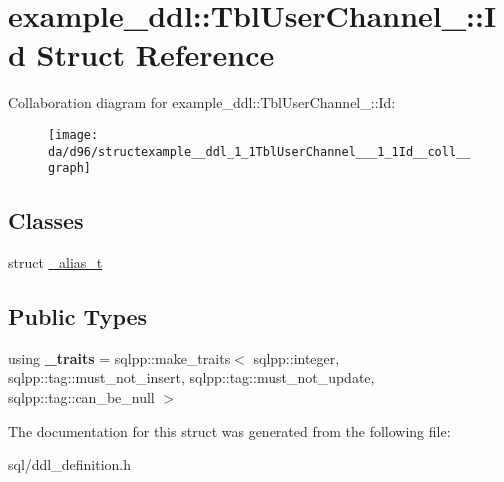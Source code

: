 \hypertarget{structexample__ddl_1_1TblUserChannel___1_1Id}{}\section{example\+\_\+ddl\+:\+:Tbl\+User\+Channel\+\_\+\+:\+:Id Struct Reference}
\label{structexample__ddl_1_1TblUserChannel___1_1Id}


Collaboration diagram for example\+\_\+ddl\+:\+:Tbl\+User\+Channel\+\_\+\+:\+:Id\+:
\nopagebreak
\begin{figure}[H]
\begin{center}
\leavevmode
\texttt{[image: da/d96/structexample\_\_ddl\_1\_1TblUserChannel\_\_\_1\_1Id\_\_coll\_\_graph]}
\end{center}
\end{figure}
\subsection*{Classes}
\begin{DoxyCompactItemize}
\item 
struct \hyperlink{structexample__ddl_1_1TblUserChannel___1_1Id_1_1__alias__t}{\+\_\+alias\+\_\+t}
\end{DoxyCompactItemize}
\subsection*{Public Types}
\begin{DoxyCompactItemize}
\item 
\hypertarget{structexample__ddl_1_1TblUserChannel___1_1Id_a66f3994a470bdc1623eab4e3305575c5}{}using {\bfseries \+\_\+traits} = sqlpp\+::make\+\_\+traits$<$ sqlpp\+::integer, sqlpp\+::tag\+::must\+\_\+not\+\_\+insert, sqlpp\+::tag\+::must\+\_\+not\+\_\+update, sqlpp\+::tag\+::can\+\_\+be\+\_\+null $>$\label{structexample__ddl_1_1TblUserChannel___1_1Id_a66f3994a470bdc1623eab4e3305575c5}

\end{DoxyCompactItemize}


The documentation for this struct was generated from the following file\+:\begin{DoxyCompactItemize}
\item 
sql/ddl\+\_\+definition.\+h\end{DoxyCompactItemize}
